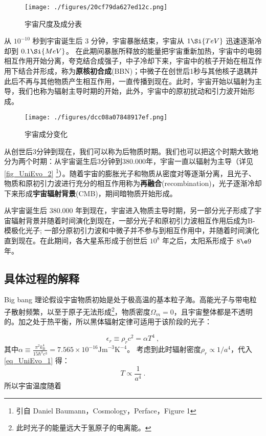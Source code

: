 \begin{figure}[ht]
\centering
\texttt{[image: ./figures/20cf79da627ed12c.png]}
\caption{宇宙尺度及成分表} \label{fig_UniEvo_1}
\end{figure}

从 $10^{-10}$ 秒到宇宙诞生后 3 分钟，宇宙暴胀结束，宇宙从 $1\Si{TeV}$ 迅速逐渐冷却到 $0.1 \Si{MeV}$。 在此期间暴胀所释放的能量把宇宙重新加热，宇宙中的电弱相互作用开始分离，夸克结合成强子，中子冷却下来，宇宙中的核子开始在相互作用下结合并形成，称为\textbf{原核初合成}(BBN)；中微子在创世后1秒与其他核子退耦并此后不再与其他物质产生相互作用，一直传播到现在。此时，宇宙开始以辐射为主导，我们也称为辐射主导时期的开始，此外，宇宙中的原初扰动和引力波开始形成。

\begin{figure}[ht]
\centering
\texttt{[image: ./figures/dcc08a07848917ef.png]}
\caption{宇宙成分变化} \label{fig_UniEvo_2}
\end{figure}

从创世后3分钟到现在，我们可以称为后物质时期。我们也可以把这个时期大致地分为两个时期：从宇宙诞生后3分钟到380.000年，宇宙一直以辐射为主导（详见\autoref{fig_UniEvo_2} \footnote{引自 Daniel Baumann，Cosmology，Perface，Figure 1}）。随着宇宙的膨胀光子和物质从密度对等逐渐分离，且光子、物质和原初引力波进行充分的相互作用称为\textbf{再融合}(recombination)，光子逐渐冷却下来形成\textbf{宇宙辐射背景}(CMB)，期间暗物质开始形成。

从宇宙诞生后 $380.000$ 年到现在，宇宙进入物质主导时期，另一部分光子形成了宇宙辐射背景并随着时间演化到现在，一部分光子和原初引力波相互作用后成为B-模极化光子; 一部分原初引力波和中微子并不参与到相互作用中，并随着时间演化直到现在。在此期间，各大星系形成于创世后 $10^8$ 年之后，太阳系形成于 $8\e9$ 年。
\subsection{具体过程的解释}
Big bang 理论假设宇宙物质初始是处于极高温的基本粒子海。高能光子与带电粒子散射频繁，以至于原子无法形成\footnote{此时光子的能量远大于氢原子的电离能。}，物质密度$\Omega_m=0$，且宇宙整体都是不透明的。加之处于热平衡，所以黑体辐射定律可适用于该阶段的光子：

\begin{equation}\label{eq_UniEvo_1}
\epsilon_r\equiv\rho_rc^2=\alpha T^4~,
\end{equation}
其中$\alpha\equiv\frac{\pi^2k_\mathrm{B}^4}{15\hbar^3c^3}=7.565\times10^{-16} \mathrm{Jm}^{-3} \mathrm{K}^{-4}$。
考虑到此时辐射密度$\rho_r\propto 1/a^4$，代入\autoref{eq_UniEvo_1} 得：
\begin{equation}
T\propto \frac{1}{a^4}~.
\end{equation}
所以宇宙温度随着